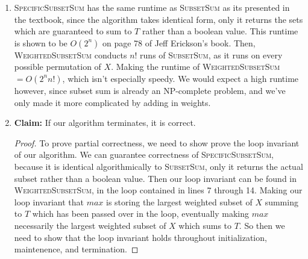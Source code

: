 \documentclass{article}
\begin{document}
\begin{enumerate}
\begin{algorithm}
\begin{algorithmic}[1]
                \end{algorithmic}
                \end{algorithm}

		\begin{algorithm}\caption{\textsc{WeightedSubsetSum}($X$, $W$, $T$)}\label{alg:sss}
                        {\bf Input:} A set $X$ with corresponding weights $W$, and a positive integer $T$\\
                        {\bf Output:} Return the maximally weighted subset of $X$ which sums to $T$ if any exist. 
			If not, return $-\infty$.
                \begin{algorithmic}[1]
			\State $X^*_1, ... , X^*_{|X|!} \gets$ All possible permutations of $X$
			\State $W^*_1, ..., W^*_{|X|!} \gets$ the corresponding weights to all permutations of $X$
			\State $i \gets 1$
			\State $n \gets |X|$
			\State $max \gets \{-\infty\}$
			\State $maxVal \gets -\infty$
				\State $current \gets$ \textsc{SpecificSubsetSum}($X^*_i, \emptyset, W^*_i, |X^*_i|, T$)
				\State $currentVal \gets W_{current}[1] + ... + W_{current}[|W_{current}|]$
					\State $maxVal \gets currentVal$
					\State $max \gets current$
				\EndIf
			\EndFor
			\State \Return $max$

		\end{algorithmic}
		\end{algorithm}

	\item
		\textsc{SpecificSubsetSum} has the same runtime as \textsc{SubsetSum} as its presented in the textbook,
		since the algorithm takes identical form, only it returns the sets which are guaranteed to sum to $T$
		rather than a boolean value. This runtime is shown to be $O(2^n)$ on page 78 of Jeff Erickson's book.
		Then, \textsc{WeightedSubsetSum} conducts $n!$ runs of \textsc{SubsetSum}, as it runs on every possible
		permutation of $X$. Making the runtime of \textsc{WeightedSubsetSum} $=O(2^nn!)$, which isn't especially
		speedy. We would expect a high runtime however, since subset sum is already an NP-complete problem,
		and we've only made it more complicated by adding in weights.
	\item
		\textbf{Claim:} If our algorithm terminates, it is correct.
		\begin{proof}
			To prove partial correctness, we need to show prove the loop invariant of our algorithm. We can
			guarantee correctness of \textsc{SpecificSubsetSum}, because it is identical algorithmically to
			\textsc{SubsetSum}, only it returns the actual subset rather than a boolean value. Then our loop
			invariant can be found in \textsc{WeightedSubsetSum}, in the loop contained in lines 7 through 14.
			Making our loop invariant that $max$ is storing the largest weighted subset of $X$ summing to $T$
			which has been passed over in the loop, eventually making $max$ necessarily the largest weighted subset of $X$
			which sums to $T$. So then we need to show that the loop invariant holds throughout initialization,
			maintenence, and termination.


\end{proof}
\end{enumerate}
\end{document}
